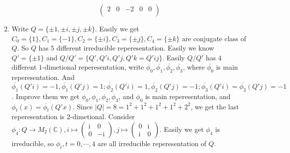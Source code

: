\documentclass{ctexart}
\begin{document}
\begin{solution}
\begin{enumerate}
\[\begin{pmatrix}
				      2 & 0  & -2 & 0  & 0  \\
			      \end{pmatrix}
		      \]
		\item
		      Write \(Q=\{\pm 1,\pm i,\pm j,\pm k\}\). Easily we get \(C_0=\{1\},C_1=\{- 1\},C_2=\{\pm i\},C_3=\{\pm j\},C_4=\{\pm k\}\) are conjugate class of \(Q\).
		      So \(Q\) has \(5\) different irreducible reperesentation.
		      Easily we know \(Q'=\{\pm 1\}\) and \(Q / Q'=\{Q',Q'i,Q'j,Q'k=Q'ij\}\).
		      Easily \(Q / Q'\) has \(4\) different \(1\)-dimetional reperesentation, write \(\overline{\phi_0},\overline{\phi_1},\overline{\phi_2},\overline{\phi_3}\), where \(\overline{\phi_0}\) is main reperesentation.
		      And \(\overline{\phi_1}(Q'i)=-1,\overline{\phi_1}(Q'j)=1;\overline{\phi_2}(Q'i)=1,\overline{\phi_2}(Q'j)=-1;\overline{\phi_3}(Q'i)=\overline{\phi_3}(Q'j)=-1\).
		      Improve them we get \(\phi_0,\phi_1,\phi_2,\phi_3\), and \(\phi_0\) is main reperesentation, and
		      \(\phi_t(x)=\overline{\phi_t}(Q'x)\).
		      Since \(|Q|=8=1^2+1^2+1^2+1^2+2^2\), we get the last reperesentation is \(2\)-dimetional.
		      Consider \(\phi_4:Q \to M_2(\mathbb{C}),i \mapsto \begin{pmatrix}
			      \mathrm{i} & 0           \\
			      0          & -\mathrm{i}
		      \end{pmatrix}, j \mapsto \begin{pmatrix}
			      0          & \mathrm{i} \\
			      \mathrm{i} & 0
		      \end{pmatrix}\).
		      Easily we get \(\phi_4\) is irreducible, so \(\phi_t,t=0,\cdots,4\) are all irreducible reperesentation of \(Q\).


\end{enumerate}
\end{solution}
\end{document}
